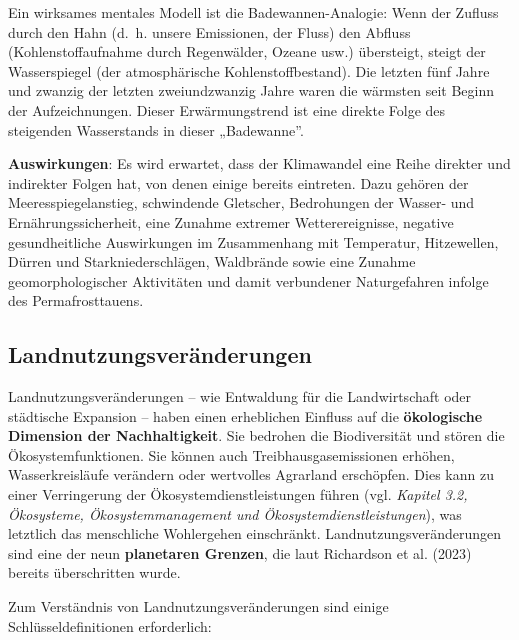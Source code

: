 \documentclass[
  nswissgerman,
  a4paper,
  DIV=11,
  numbers=noendperiod,
  oneside,
  openany]{scrreprt}
\begin{document}
Ein wirksames mentales Modell ist die Badewannen-Analogie: Wenn der
Zufluss durch den Hahn (d.~h. unsere Emissionen, der Fluss) den Abfluss
(Kohlenstoffaufnahme durch Regenwälder, Ozeane usw.) übersteigt, steigt
der Wasserspiegel (der atmosphärische Kohlenstoffbestand). Die letzten
fünf Jahre und zwanzig der letzten zweiundzwanzig Jahre waren die
wärmsten seit Beginn der Aufzeichnungen. Dieser Erwärmungstrend ist eine
direkte Folge des steigenden Wasserstands in dieser „Badewanne''.

\textbf{Auswirkungen}: Es wird erwartet, dass der Klimawandel eine Reihe
direkter und indirekter Folgen hat, von denen einige bereits eintreten.
Dazu gehören der Meeresspiegelanstieg, schwindende Gletscher,
Bedrohungen der Wasser- und Ernährungssicherheit, eine Zunahme extremer
Wetterereignisse, negative gesundheitliche Auswirkungen im Zusammenhang
mit Temperatur, Hitzewellen, Dürren und Starkniederschlägen, Waldbrände
sowie eine Zunahme geomorphologischer Aktivitäten und damit verbundener
Naturgefahren infolge des Permafrosttauens.

\subsection{Landnutzungsveränderungen}\label{landnutzungsveruxe4nderungen}

Landnutzungsveränderungen -- wie Entwaldung für die Landwirtschaft oder
städtische Expansion -- haben einen erheblichen Einfluss auf die
\textbf{ökologische Dimension der Nachhaltigkeit}. Sie bedrohen die
Biodiversität und stören die Ökosystemfunktionen. Sie können auch
Treibhausgasemissionen erhöhen, Wasserkreisläufe verändern oder
wertvolles Agrarland erschöpfen. Dies kann zu einer Verringerung der
Ökosystemdienstleistungen führen (vgl. \emph{Kapitel 3.2, Ökosysteme,
Ökosystemmanagement und Ökosystemdienstleistungen}), was letztlich das
menschliche Wohlergehen einschränkt. Landnutzungsveränderungen sind eine
der neun \textbf{planetaren Grenzen}, die laut Richardson et al. (2023)
bereits überschritten wurde.

Zum Verständnis von Landnutzungsveränderungen sind einige
Schlüsseldefinitionen erforderlich:
\end{document}
